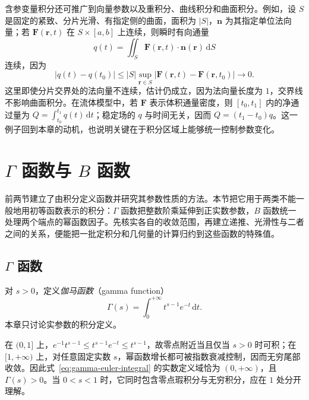 \documentclass[UTF8,12pt,a4paper,fontset=fandol]{ctexbook}
\begin{document}
含参变量积分还可推广到向量参数以及重积分、曲线积分和曲面积分。例如，设 $S$ 是固定的紧致、分片光滑、有指定侧的曲面，面积为 $|S|$，$\boldsymbol n$ 为其指定单位法向量；若 $\boldsymbol F(\boldsymbol r,t)$ 在 $S\times[a,b]$ 上连续，则瞬时有向通量
\[
    q(t)=\iint_S\boldsymbol F(\boldsymbol r,t)\cdot\boldsymbol n(\boldsymbol r)\,\mathrm{d}S
\]
连续，因为
\[
    |q(t)-q(t_0)|\leq |S|\sup_{\boldsymbol r\in S}
       |\boldsymbol F(\boldsymbol r,t)-\boldsymbol F(\boldsymbol r,t_0)|\longrightarrow0.
\]
这里即使分片交界处的法向量不连续，估计仍成立，因为法向量长度为 $1$，交界线不影响曲面积分。在流体模型中，若 $\boldsymbol F$ 表示体积通量密度，则 $[t_0,t_1]$ 内的净通过量为 $Q=\int_{t_0}^{t_1}q(t)\,\mathrm{d}t$；稳定场的 $q$ 与时间无关，因而 $Q=(t_1-t_0)q$。这一例子回到本章的动机，也说明关键在于积分区域上能够统一控制参数变化。

\section{\texorpdfstring{$\Gamma$}{Gamma} 函数与 \texorpdfstring{$B$}{B} 函数}
\label{sec:gamma-and-beta-functions}

前两节建立了由积分定义函数并研究其参数性质的方法。本节把它用于两类不能一般地用初等函数表示的积分：$\Gamma$ 函数把整数阶乘延伸到正实数参数，$B$ 函数统一处理两个端点的幂函数因子。先核实各自的收敛范围，再建立递推、光滑性与二者之间的关系，便能把一批定积分和几何量的计算归约到这些函数的特殊值。

\subsection{\texorpdfstring{$\Gamma$}{Gamma} 函数}
\label{subsec:gamma-function}

\begin{definition}[伽马函数]
\label{def:gamma-euler-integral}
对 $s>0$，定义\emph{伽马函数}（gamma function）
\begin{equation}
    \Gamma(s)=\int_0^{+\infty}t^{s-1}e^{-t}\,\mathrm{d}t.
    \label{eq:gamma-euler-integral}
\end{equation}
本章只讨论实参数的积分定义。
\end{definition}

在 $(0,1]$ 上，$e^{-1}t^{s-1}\leq t^{s-1}e^{-t}\leq t^{s-1}$，故零点附近当且仅当 $s>0$ 时可积；在 $[1,+\infty)$ 上，对任意固定实数 $s$，幂函数增长都可被指数衰减控制，因而无穷尾部收敛。因此式~\eqref{eq:gamma-euler-integral} 的实数定义域恰为 $(0,+\infty)$，且 $\Gamma(s)>0$。当 $0<s<1$ 时，它同时包含零点瑕积分与无穷积分，应在 $1$ 处分开理解。
\end{document}
